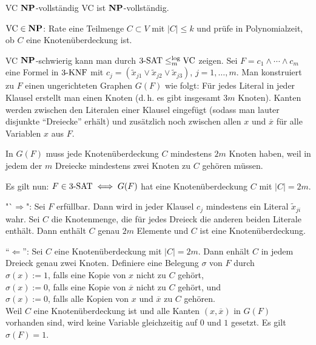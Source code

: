 \begin{Satz}{VC $\mathbf{NP}$-vollständig}
    VC ist $\mathbf{NP}$-vollständig.
\end{Satz}

\begin{Beweis}
    $\text{VC} \in \mathbf{NP}$:
    Rate eine Teilmenge $C \subset V$ mit $|C| \le k$ und prüfe in Polynomialzeit, ob $C$ eine
    Knotenüberdeckung ist.

    VC $\mathbf{NP}$-schwierig kann man durch $3\text{-SAT} \le_m^{\log} \text{VC}$ zeigen.
    Sei $F = c_1 \land \dotsb \land c_m$ eine Formel in $3\text{-}\text{KNF}$ mit
    $c_j = (\widetilde{x}_{j1} \lor \widetilde{x}_{j2} \lor \widetilde{x}_{j3})$,
    $j = 1, \dotsc, m$.
    Man konstruiert zu $F$ einen ungerichteten Graphen $G(F)$ wie folgt:
    Für jedes Literal in jeder Klausel erstellt man einen Knoten
    (d.\,h. es gibt insgesamt $3m$ Knoten).
    Kanten werden zwischen den Literalen einer Klausel eingefügt
    (sodass man lauter disjunkte "`Dreiecke"' erhält)
    und zusätzlich noch zwischen allen $x$ und $\overline{x}$ für alle Variablen $x$ aus $F$.

    In $G(F)$ muss jede Knotenüberdeckung $C$ mindestens $2m$ Knoten haben,
    weil in jedem der $m$ Dreiecke mindestens zwei Knoten zu $C$ gehören müssen.

    Es gilt nun: $F \in 3\text{-SAT} \iff G(F)$ hat eine Knotenüberdeckung $C$ mit $|C| = 2m$.

    "`$\Rightarrow$":
    Sei $F$ erfüllbar.
    Dann wird in jeder Klausel $c_j$ mindestens ein Literal $\widetilde{x}_{ji}$ wahr.
    Sei $C$ die Knotenmenge, die für jedes Dreieck die anderen beiden Literale enthält.
    Dann enthält $C$ genau $2m$ Elemente und $C$ ist eine Knotenüberdeckung.

    "`$\Leftarrow$"':
    Sei $C$ eine Knotenüberdeckung mit $|C| = 2m$.
    Dann enhält $C$ in jedem Dreieck genau zwei Knoten.
    Definiere eine Belegung $\sigma$ von $F$ durch\\
    $\sigma(x) := 1$, falls eine Kopie von $x$ nicht zu $C$ gehört,\\
    $\sigma(x) := 0$, falls eine Kopie von $\overline{x}$ nicht zu $C$ gehört, und\\
    $\sigma(x) := 0$, falls alle Kopien von $x$ und $\overline{x}$ zu $C$ gehören.\\
    Weil $C$ eine Knotenüberdeckung ist und alle Kanten $(x, \overline{x})$ in $G(F)$ vorhanden
    sind, wird keine Variable gleichzeitig auf $0$ und $1$ gesetzt.
    Es gilt $\sigma(F) = 1$.
\end{Beweis}


